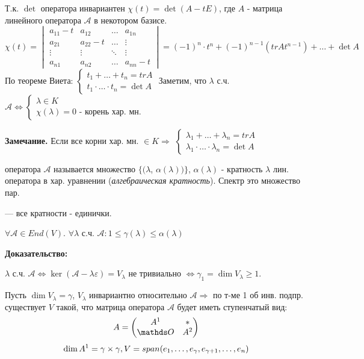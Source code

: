 Т.к. $\det$ оператора инвариантен $\chi(t) = \det (A - tE)$, где $A$ - матрица линейного оператора $\mathcal{A}$ в некотором базисе.
$$\chi(t) =\begin{vmatrix}
    a_{11} -t & a_{12} & \ldots & a_{1n} \\
    a_{21} & a_{22}-t & \ldots & \vdots\\
    \vdots & \vdots & \ddots & \vdots\\
    a_{n1} & a_{n2} & \ldots & a_{nn}-t
\end{vmatrix} = (-1)^{n}\cdot t^n + (-1)^{n-1}(tr At^{n-1}) + \ldots + \det A$$
По теореме Виета:
$\begin{cases}
t_1 +\ldots+t_n = tr A\\
t_1\cdot \ldots \cdot t_n = \det A
\end{cases}$
Заметим, что $\lambda$ с.ч. $\mathcal{A} \Leftrightarrow\begin{cases}
    \lambda \in K\\
    \chi(\lambda) = 0 \text{ - корень хар. мн.}
\end{cases}$

\textbf{Замечание.} Если все корни хар. мн. $\in K \Rightarrow$ $\begin{cases}
\lambda_1 +\ldots+\lambda_n = tr A\\
\lambda_1\cdot \ldots \cdot \lambda_n = \det A
\end{cases}$

  оператора $\mathcal{A}$ называется множество $\{ (\lambda$, $\alpha(\lambda)) \}$,
$\alpha(\lambda)$ - кратность $\lambda$ лин. оператора в хар. уравнении (\emph{алгебраическая кратность}). Спектр это множество пар.

  --- все кратности -  единички.



$\forall \mathcal{A}\in End(V)$. $\forall \lambda$ с.ч. $\mathcal{A} : 1\leq \gamma(\lambda)\leq \alpha(\lambda)$

\textbf{Доказательство:}

$\lambda$ с.ч. $\mathcal{A} \Leftrightarrow \ker(\mathcal{A}-\lambda \varepsilon)= V_{\lambda}$ не тривиально $\Leftrightarrow \gamma_1=\dim V_\lambda\geq 1$.

Пусть $\dim V_{\lambda} = \gamma$, $V_{\lambda}$ инвариантно относительно $\mathcal{A} \Rightarrow$ по т-ме 1 об инв. подпр. существует $V$ такой, что матрица оператора $\mathcal{A}$ будет иметь ступенчатый вид:
$$A =\begin{pmatrix}
    A^1 & *\\
    \zero & A^2
\end{pmatrix}$$
$$\dim A^1 = \gamma \times \gamma,V = span(e_1,\ldots, e_{\gamma},e_{\gamma+1},\ldots,e_{n})$$

